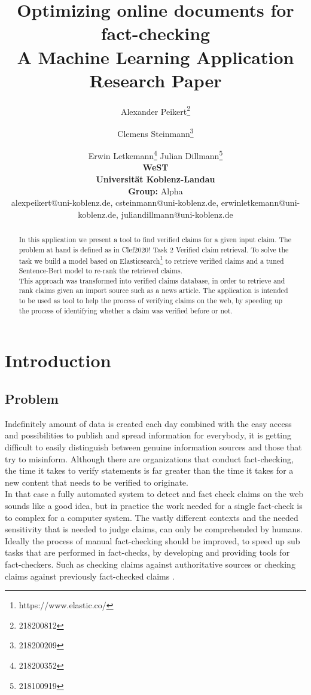 \documentclass{article}
\title{Optimizing online documents for fact-checking\\
A Machine Learning Application\\
Research Paper\\}
\author{
Alexander Peikert\footnote{218200812}\and
Clemens Steinmann\footnote{218200209}\and
Erwin Letkemann\footnote{218200352}\And
Julian Dillmann\footnote{218100919}\\
\affiliations
\textbf{WeST} \\
\textbf{Universität Koblenz-Landau} \\
\textbf{Group:} Alpha

\emails
alexpeikert@uni-koblenz.de,
csteinmann@uni-koblenz.de,
erwinletkemann@uni-koblenz.de,
juliandillmann@uni-koblenz.de
}
\begin{document}
\maketitle

\begin{abstract}
In this application we present a tool to find verified claims for a given input claim.
The problem at hand is defined as in Clef2020! Task 2\cite{DBLP:conf/ecir/Barron-CedenoEN20} Verified claim retrieval.
To solve the task we build a model based on Elasticsearch\footnote{https://www.elastic.co/} to retrieve verified claims and a tuned Sentence-Bert\cite{DBLP:conf/emnlp/ReimersG19} model to re-rank the retrieved claims.\\
This approach was transformed into verified claims database, in order to retrieve and rank claims given an import source such as a news article.
The application is intended to be used as tool to help the process of verifying claims on the web, by speeding up the process of identifying whether a claim was verified before or not.

\end{abstract}

\section{Introduction}
\subsection{Problem}
Indefinitely amount of data is created each day combined with the easy access and possibilities to publish and spread information for everybody, it is getting difficult to easily distinguish between genuine information sources and those that try to misinform.
Although there are organizations that conduct fact-checking, the time it takes to verify statements is far greater than the time it takes for a new content that needs to be verified to originate.\\
In that case a fully automated system to detect and fact check claims on the web sounds like a good idea, but in practice the work needed for a single fact-check is to complex for a computer system.
The vastly different contexts and the needed sensitivity that is needed to judge claims, can only be comprehended by humans.
Ideally the process of manual fact-checking should be improved, to speed up sub tasks that are performed in fact-checks, by developing and providing tools for fact-checkers. Such as checking claims against authoritative sources or checking claims against previously fact-checked claims \cite{graves2018a}.
\end{document}
